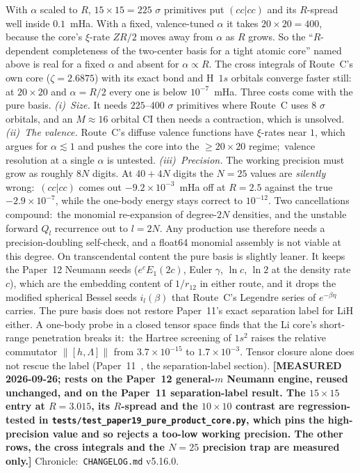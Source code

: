 \documentclass[aps,pra,twocolumn,superscriptaddress,longbibliography]{revtex4-2}
\begin{document}
With $\alpha$ scaled to $R$, $15\times15=225$ $\sigma$ primitives put $(cc|cc)$
and its $R$-spread well inside $0.1$~mHa.  With a fixed, valence-tuned $\alpha$
it takes $20\times20=400$, because the core's $\xi$-rate $ZR/2$ moves away from
$\alpha$ as $R$ grows.  So the ``$R$-dependent completeness of the two-center
basis for a tight atomic core'' named above is real for a fixed $\alpha$ and
absent for $\alpha\propto R$.  The cross integrals of Route~C's own core
($\zeta=2.6875$) with its exact bond and H~$1s$ orbitals converge faster still:
at $20\times20$ and $\alpha=R/2$ every one is below $10^{-7}$~mHa.  Three costs
come with the pure basis.  \emph{(i)~Size.}  It needs $225$--$400$ $\sigma$
primitives where Route~C uses $8$ $\sigma$ orbitals, and an $M\approx16$ orbital
CI then needs a contraction, which is unsolved.  \emph{(ii)~The valence.}
Route~C's diffuse valence functions have $\xi$-rates near $1$, which argues for
$\alpha\lesssim1$ and pushes the core into the $\ge20\times20$ regime;\ valence
resolution at a single $\alpha$ is untested.  \emph{(iii)~Precision.}  The
working precision must grow as roughly $8N$ digits.  At $40+4N$ digits the
$N=25$ values are \emph{silently} wrong:\ $(cc|cc)$ comes out $-9.2\times10^{-3}$~mHa
off at $R=2.5$ against the true $-2.9\times10^{-7}$, while the one-body energy
stays correct to $10^{-12}$.  Two cancellations compound:\ the monomial
re-expansion of degree-$2N$ densities, and the unstable forward $Q_l$ recurrence
out to $l=2N$.  Any production use therefore needs a precision-doubling
self-check, and a float64 monomial assembly is not viable at this degree.  On
transcendental content the pure basis is slightly leaner.  It keeps the
Paper~12 Neumann seeds ($e^{c}E_1(2c)$, Euler $\gamma$, $\ln c$, $\ln2$ at the
density rate $c$), which are the embedding content of $1/r_{12}$ in either
route, and it drops the modified spherical Bessel seeds $i_l(\beta)$ that
Route~C's Legendre series of $e^{-\beta\eta}$ carries.  The pure basis does not
restore Paper~11's exact separation label for LiH either.  A one-body probe in a
closed tensor space finds that the Li core's short-range penetration breaks it:\
the Hartree screening of $1s^2$ raises the relative commutator
$\|[h,\Lambda]\|$ from $3.7\times10^{-15}$ to $1.7\times10^{-3}$.  Tensor closure
alone does not rescue the label (Paper~11~\cite{loutey_paper11}, the
separation-label section).
\textbf{[MEASURED 2026-09-26; rests on the Paper~12 general-$m$ Neumann engine,
reused unchanged, and on the Paper~11 separation-label result.  The $15\times15$
entry at $R=3.015$, its $R$-spread and the $10\times10$ contrast are
regression-tested in \texttt{tests/test\_paper19\_pure\_product\_core.py}, which
pins the high-precision value and so rejects a too-low working precision.  The
other rows, the cross integrals and the $N=25$ precision trap are measured
only.]}
Chronicle:\ \texttt{CHANGELOG.md} v5.16.0.
\end{document}
